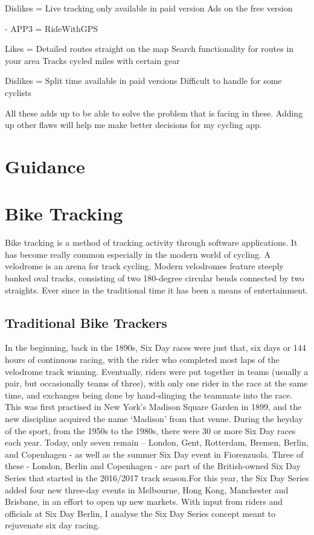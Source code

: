 \documentclass{l4proj}
\begin{document}
Dislikes = Live tracking only available in paid version
                 Ads on the free version


- APP3 = RideWithGPS

Likes = Detailed routes straight on the map
             Search functionality for routes in your area
             Tracks cycled miles with certain gear
 
Dislikes = Split time available in paid versions
                  Difficult to handle for some cyclists

All these adds up to be able to solve the problem that is facing in these. Adding up other flaws will help me make better decisions for my cycling app.



\section{Guidance}
\section{Bike Tracking}

Bike tracking is a method of tracking activity through software applications. It has become really common especially in the modern world of cycling. A velodrome is an arena for track cycling. Modern velodromes feature steeply banked oval tracks, consisting of two 180-degree circular bends connected by two straights. Ever since in the traditional time it has been a means of entertainment.


\subsection{Traditional Bike Trackers}
\label{traditionalBike}
In the beginning, back in the 1890s, Six Day races were just that, six days or 144 hours of continuous racing, with the rider who completed most laps of the velodrome track winning.\cite{oke2015tracking}
Eventually, riders were put together in teams (usually a pair, but occasionally teams of three), with only one rider in the race at the same time, and exchanges being done by hand-slinging the teammate into the race.
This was first practised in New York’s Madison Square Garden in 1899, and the new discipline acquired the name ‘Madison’ from that venue.
During the heyday of the sport, from the 1950s to the 1980s, there were 30 or more Six Day races each year. Today, only seven remain – London, Gent, Rotterdam, Bremen, Berlin, and Copenhagen - as well as the summer Six Day event in Fiorenzuola.
Three of these - London, Berlin and Copenhagen - are part of the British-owned Six Day Series that started in the 2016/2017 track season.For this year, the Six Day Series added four new three-day events in Melbourne, Hong Kong, Manchester and Brisbane, in an effort to open up new markets.
With input from riders and officials at Six Day Berlin, I analyse the Six Day Series concept meant to rejuvenate six day racing. 
\end{document}
